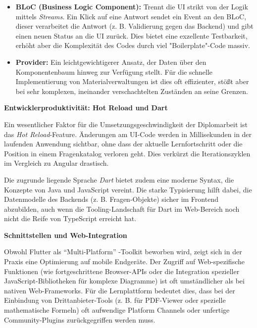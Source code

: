\begin{itemize}
\item \textbf{BLoC (Business Logic Component):} Trennt die UI strikt von der Logik mittels \textit{Streams}. Ein Klick auf eine Antwort sendet ein Event an den BLoC, dieser verarbeitet die Antwort (z. B. Validierung gegen das Backend) und gibt einen neuen Status an die UI zurück. Dies bietet eine exzellente Testbarkeit, erhöht aber die Komplexität des Codes durch viel "Boilerplate"-Code massiv.
\item \textbf{Provider:} Ein leichtgewichtigerer Ansatz, der Daten über den Komponentenbaum hinweg zur Verfügung stellt. Für die schnelle Implementierung von Materialverwaltungen ist dies oft effizienter, stößt aber bei sehr komplexen, ineinander verschachtelten Zuständen an seine Grenzen.
\end{itemize}

\vspace{0.7cm}
\textbf{Entwicklerproduktivität: Hot Reload und Dart}

Ein wesentlicher Faktor für die Umsetzungsgeschwindigkeit der Diplomarbeit ist das \textit{Hot Reload}-Feature. Änderungen am UI-Code werden in Millisekunden in der laufenden Anwendung sichtbar, ohne dass der aktuelle Lernfortschritt oder die Position in einem Fragenkatalog verloren geht. Dies verkürzt die Iterationszyklen im Vergleich zu Angular drastisch.

Die zugrunde liegende Sprache \textit{Dart} bietet zudem eine moderne Syntax, die Konzepte von Java und JavaScript vereint. Die starke Typisierung hilft dabei, die Datenmodelle des Backends (z. B. Fragen-Objekte) sicher im Frontend abzubilden, auch wenn die Tooling-Landschaft für Dart im Web-Bereich noch nicht die Reife von TypeScript erreicht hat.

\vspace{0.7cm}
\textbf{Schnittstellen und Web-Integration}

Obwohl Flutter als "`Multi-Platform"' -Toolkit beworben wird, zeigt sich in der Praxis eine Optimierung auf mobile Endgeräte. Der Zugriff auf Web-spezifische Funktionen (wie fortgeschrittene Browser-APIs oder die Integration spezieller JavaScript-Bibliotheken für komplexe Diagramme) ist oft umständlicher als bei nativen Web-Frameworks. Für die Lernplattform bedeutet dies, dass bei der Einbindung von Drittanbieter-Tools (z. B. für PDF-Viewer oder spezielle mathematische Formeln) oft aufwendige Platform Channels oder unfertige Community-Plugins zurückgegriffen werden muss.

